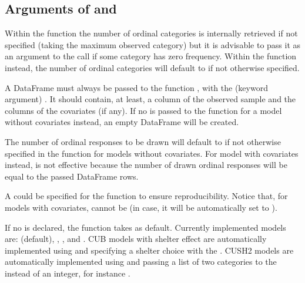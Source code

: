 \documentclass[letterpaper,10pt,english]{sphinxmanual}
\begin{document}
\subsection{Arguments of  and }
\label{\detokenize{manual:arguments-of-estimate-and-draw}}
\sphinxAtStartPar
Within the function  the number of ordinal categories  is internally retrieved if not specified
(taking the maximum observed category)
but it is advisable to pass it as an argument to the call if some category has zero frequency.
Within the function  instead, the number of ordinal categories 
will default to  if not otherwise specified.

\sphinxAtStartPar
A  DataFrame must always be passed to the function , with the 
(keyword argument) .
It should contain, at least, a column of the observed sample and the columns of the covariates (if any).
If no  is passed to the function  for a model without covariates
instead, an empty DataFrame will be created.

\sphinxAtStartPar
The number  of ordinal responses to be drawn will default to  if not otherwise specified
in the function 
for models without covariates. For model with covariates instead,  is not effective because
the number of drawn ordinal responses will be equal to the passed DataFrame rows.

\sphinxAtStartPar
A  could be specified for the function  to ensure reproducibility.
Notice that, for models with covariates,  cannot be  (in case, it will be
automatically set to ).

\sphinxAtStartPar
If no  is declared, the function takes  as default.
Currently implemented models are:  (default), , ,
and . CUB models with shelter effect are automatically
implemented using  and specifying a shelter choice with the
 . CUSH2 models are automatically
implemented using  and passing a list of two categories to
the   instead of an integer, for instance .
\end{document}
